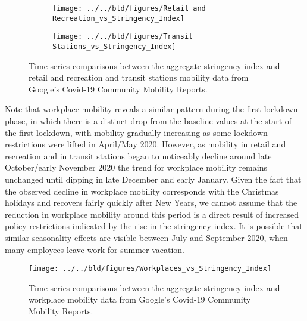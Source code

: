 \begin{figure}[H]
     \centering
     \begin{subfigure}[b]{\textwidth}
         \centering
         \texttt{[image: ../../bld/figures/Retail and Recreation\_vs\_Stringency\_Index]}
         \caption{}
         \label{fig:retail and rec}
     \end{subfigure}
     \hfill
     \begin{subfigure}[b]{\textwidth}
         \centering
         \texttt{[image: ../../bld/figures/Transit Stations\_vs\_Stringency\_Index]}
         \caption{}
         \label{fig:transit}
     \end{subfigure}
        \caption{Time series comparisons between the aggregate stringency index and retail and recreation and transit stations mobility data from Google's Covid-19 Community Mobility Reports.}
         \label{fig:retailandtransit}
\end{figure}

Note that workplace mobility reveals a similar pattern during the first lockdown phase, in which there is a distinct drop from the baseline values at the start of the first lockdown, with mobility gradually increasing as some lockdown restrictions were lifted in April/May 2020. However, as mobility in retail and recreation and in transit stations began to noticeably decline around late October/early November 2020 the trend for workplace mobility remains unchanged until dipping in late December and early January. Given the fact that the observed decline in workplace mobility corresponds with the Christmas holidays and recovers fairly quickly after New Years, we cannot assume that the reduction in workplace mobility around this period is a direct result of increased policy restrictions indicated by the rise in the stringency index. It is possible that similar seasonality effects are visible between July and September 2020, when many employees leave work for summer vacation.

\begin{figure}[H]
      \centering
      \texttt{[image: ../../bld/figures/Workplaces\_vs\_Stringency\_Index]}
      \label{fig:five over x}
      \caption{Time series comparisons between the aggregate stringency index and workplace mobility data from Google's Covid-19 Community Mobility Reports.}
      \label{fig:workplace}
\end{figure}

